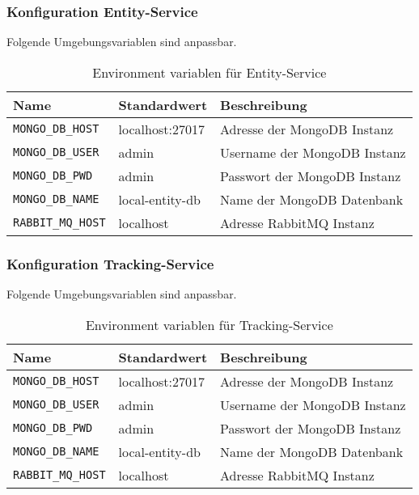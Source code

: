 \subsubsection{Konfiguration Entity-Service}

Folgende Umgebungsvariablen sind anpassbar.


\begin{table}[h]
	\begin{tabular}{|l|l|l|}
		\hline
		Name & Standardwert & Beschreibung \\ \hline
		\verb|MONGO_DB_HOST| & localhost:27017 & Adresse der MongoDB Instanz \\ \hline
		\verb|MONGO_DB_USER| & admin & Username der MongoDB Instanz \\ \hline
		\verb|MONGO_DB_PWD| & admin & Passwort der MongoDB Instanz \\ \hline
		\verb|MONGO_DB_NAME| & local-entity-db & Name der MongoDB Datenbank \\ \hline
		\verb|RABBIT_MQ_HOST| & localhost & Adresse RabbitMQ Instanz \\ \hline
	\end{tabular}
	\caption{Environment variablen für Entity-Service }
\end{table}

\subsubsection{Konfiguration Tracking-Service}

Folgende Umgebungsvariablen sind anpassbar.


\begin{table}[h]
	\begin{tabular}{|l|l|l|}
		\hline
		Name & Standardwert & Beschreibung \\ \hline
		\verb|MONGO_DB_HOST| & localhost:27017 & Adresse der MongoDB Instanz \\ \hline
		\verb|MONGO_DB_USER| & admin & Username der MongoDB Instanz \\ \hline
		\verb|MONGO_DB_PWD| & admin & Passwort der MongoDB Instanz \\ \hline
		\verb|MONGO_DB_NAME| & local-entity-db & Name der MongoDB Datenbank \\ \hline
		\verb|RABBIT_MQ_HOST| & localhost & Adresse RabbitMQ Instanz \\ \hline
	\end{tabular}
	\caption{Environment variablen für Tracking-Service }
\end{table}

